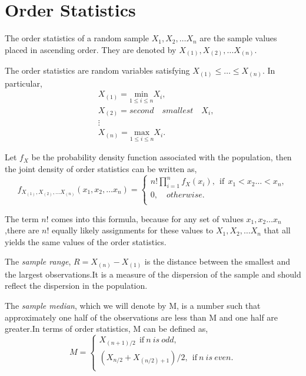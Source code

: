 \documentclass[a4paper,english,12pt]{article}
\begin{document}
\section{Order Statistics}
\begin{defn}
The order statistics of a random sample $X_1,X_2, \dots X_n$ are the sample values placed in ascending order. They are denoted by $X_{(1)},X_{(2)},\dots X_{(n)}$.
\end{defn}
The order statistics are random variables satisfying $X_{(1)}\leq\dots\leq X_{(n)}$. In particular,
\begin{align}
& X_{(1)}=\underset{1\leq i\leq n}{\text{min}} X_i ,\nonumber \\ 
& X_{(2)}=second\quad smallest\quad X_i,\\ \nonumber
& \vdots \\ \nonumber
& X_{(n)}=\underset{1\leq i\leq n}{\text{max}} X_i.
\end{align}
\begin{thm}
Let $f_X$ be the probability density function associated with the population, then the joint density of order statistics can be written as,
\begin{equation}
f_{X_{(1)},X_{(2)},\dots X_{(n)}}(x_1,x_2, \ldots x_n)= 
		\begin{cases}
		n!\prod\limits_{i=1}^n f_X (x_i),~~\mbox{if}~~x_1<x_2 \ldots <x_n,\\
		0,\quad otherwise.\\
		\end{cases}
\end{equation}
\end{thm}
\begin{rem}
The term $n!$ comes into this formula, because for any set of values $x_1,x_2\ldots x_n$,there are $n!$ equally likely assignments for these values to $X_1,X_2, \dots X_n$ that all yields the same values of the order statistics.
\end{rem}
\begin{defn}
The \textit{sample range}, $R=X_{(n)}-X_{(1)}$ is the distance between the smallest and the largest observations.It is a measure of the dispersion of the sample and should reflect the dispersion in the population.
\end{defn}
\begin{defn}
The \textit{sample median}, which we will denote by M, is a number such that approximately one half of the observations are less than M and one half are greater.In terms of order statistics, M can be defined as,
\begin{equation}
M= 
		\begin{cases}
	 X_{(n+1)/2}~~\mbox{if}~n~is~odd,\\
	(X_{n/2}+X_{(n/2)+1})/2,~~\mbox{if}~n~is~even.\\
		\end{cases}
\end{equation}
\end{defn}
\end{document}
